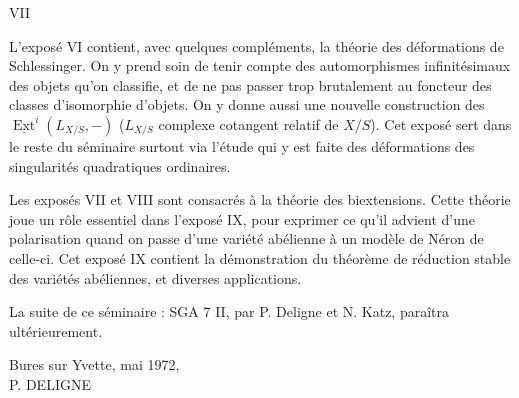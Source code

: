 \clearpage
\thispagestyle{empty}
\begin{center}
VII
\end{center}

L'exposé VI contient, avec quelques compléments, la théorie des déformations
de Schlessinger. On y prend soin de tenir compte des automorphismes infinitésimaux
des objets qu'on classifie, et de ne pas passer trop brutalement au foncteur des classes
d'isomorphie d'objets. On y donne aussi une nouvelle construction des
$\underline{\operatorname{Ext}}^{i}(L_{X/S},-)$ ($L_{X/S}$ complexe cotangent relatif de $X/S$). Cet exposé sert dans le
reste du séminaire surtout via l'étude qui y est faite des déformations des singularités
quadratiques ordinaires.

Les exposés VII et VIII sont consacrés à la théorie des biextensions. Cette
théorie joue un rôle essentiel dans l'exposé IX, pour exprimer ce qu'il advient d'une
polarisation quand on passe d'une variété abélienne à un modèle de Néron de celle-ci.
Cet exposé IX contient la démonstration du théorème de réduction stable des variétés
abéliennes, et diverses applications.

La suite de ce séminaire : SGA 7 II, par P. Deligne et N. Katz, paraîtra
ultérieurement.

\begin{flushright}
Bures sur Yvette, mai 1972,\\
P. DELIGNE
\end{flushright}
